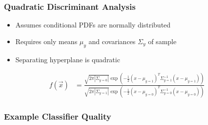 \begin{frame}
    \frametitle{Quadratic Discriminant Analysis}
    \begin{center}
		\begin{itemize}
            \item Assumes conditional PDFs are normally distributed
            \item Requires only means $\mu_y$ and covariances $\Sigma_y$ of sample
            \item Separating hyperplane is quadratic
		\end{itemize}


        \vspace{-1em}
        \begin{align*}
            f(\vec{x}) &= \frac{\sqrt{2 \pi | \Sigma_{y=0} |} \exp\left( - \frac{1}{2} \left(x - \mu_{y=1}\right)^T \Sigma^{-1}_{y=1} \left(x - \mu_{y=1}\right)  \right) }{ \sqrt{2 \pi | \Sigma_{y=1} |}  \exp\left( - \frac{1}{2} \left(x - \mu_{y=0}\right)^T \Sigma^{-1}_{y=0} \left(x - \mu_{y=0}\right)  \right)  }
        \end{align*}


        \vspace{-1.5em}
    \end{center}
\end{frame}

\begin{frame}
    \frametitle{Example Classifier Quality}
    \begin{center}
    \end{center}
\end{frame}
